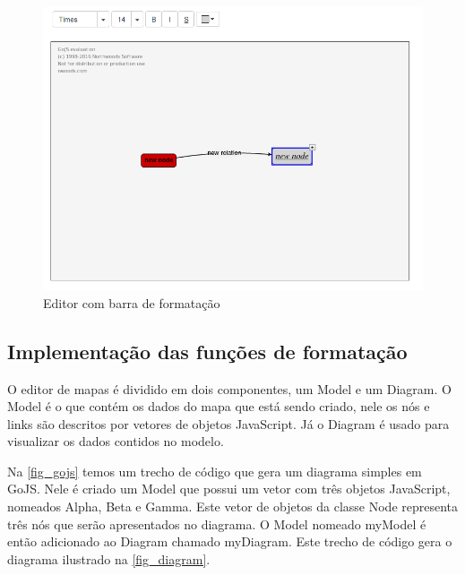 \documentclass[
	12pt,				%
	openright,			%
	oneside,			%
	a4paper,			%
	english,			%
	french,				%
	spanish,			%
	brazil				%
	]{abntex2}
\begin{document}
\begin{figure}[htb]
	\caption{\label{fig_barraformacao} Editor com barra de formatação}
	\begin{center}
		\includegraphics[scale=0.5]{barraformacao.png}
	\end{center}
\end{figure}

\subsection{Implementação das funções de formatação}
O editor de mapas é dividido em dois componentes, um Model e um Diagram. O Model é o que contém os dados do mapa que está sendo criado, nele os nós e links são descritos por vetores de objetos JavaScript. Já o Diagram é usado para visualizar os dados contidos no modelo.

Na \autoref{fig_gojs} temos um trecho de código que gera um diagrama simples em GoJS. Nele é criado um Model que possui um vetor com três objetos JavaScript, nomeados Alpha, Beta e Gamma. Este vetor de objetos da classe Node representa três nós que serão apresentados no diagrama. O Model nomeado myModel é então adicionado ao Diagram chamado myDiagram. Este trecho de código gera o diagrama ilustrado na \autoref{fig_diagram}.
\end{document}
